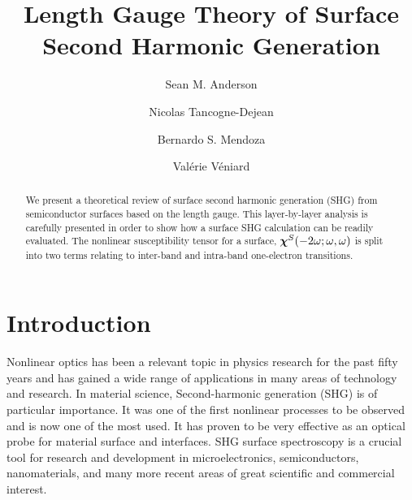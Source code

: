 \documentclass[floatfix,prb,aps,superscriptaddress,11pt,preprint,letterpaper]{revtex4}
\def\chon{black}
\begin{document}
\title{Length Gauge Theory of Surface Second Harmonic Generation}
\author{Sean M. Anderson}
\author{Nicolas Tancogne-Dejean}
\author{Bernardo S. Mendoza}
\author{Val\'erie V\'eniard}

\begin{abstract}
We present a theoretical review of surface second harmonic generation (SHG) 
from semiconductor surfaces based on the {\color{\chon} length} gauge. This 
layer-by-layer analysis is carefully presented in order to show how a 
surface SHG calculation can be readily evaluated. The nonlinear susceptibility 
tensor for a surface, $\boldsymbol{\chi}^S(-2\omega;\omega,\omega)$
is split into two terms relating to inter-band 
and intra-band one-electron transitions. 

\end{abstract}  

\maketitle

\section{Introduction}\label{intro}

Nonlinear optics has been a relevant topic in physics research for the past 
fifty years and has gained a wide range of applications in 
many areas of technology and research. In material science,
Second-harmonic generation (SHG) is of particular importance.
It was one of the first nonlinear processes to be observed and is now one
of the most used. It has proven to be very effective as an 
optical probe for material surface and interfaces. 
\cite{hughesPRB96, 
     guyot-sionnestPRB88, 
     lupkeSSR99, 
     downerPSSA01, 
     shenAPB99, 
     shenNAT89, 
     chenPRL81, 
     maytorenaPRB98}
SHG surface spectroscopy is a crucial tool for research and development
in microelectronics, semiconductors, nanomaterials, and many more recent 
areas of great scientific and commercial interest.
\end{document}
